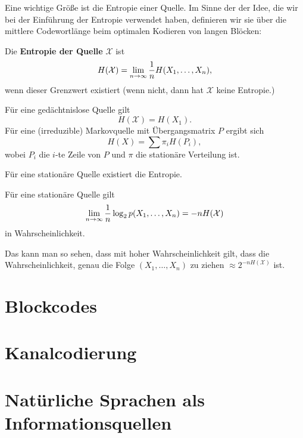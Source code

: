 Eine wichtige Größe ist die Entropie einer Quelle. Im Sinne der 
der Idee, die wir bei der Einführung der Entropie verwendet haben, 
definieren wir sie über die mittlere Codewortlänge beim optimalen
Kodieren von langen Blöcken:

\begin{definition} Die \textbf{Entropie der Quelle} $\mathcal X$ ist 
\[H(\mathcal X)=\lim_{n\to\infty}{1\over n}H(X_1,\dots,X_n),\]
wenn dieser Grenzwert existiert (wenn nicht, dann hat $\mathcal X$
keine Entropie.)
\end{definition}

Für eine gedächtnislose Quelle gilt
\[H(\mathcal X)=H(X_1).\]
Für eine (irreduzible) Markovquelle mit Übergangsmatrix $P$ ergibt sich
\[H(X)=\sum\pi_iH(P_i),\]
wobei $P_i$ die $i$-te Zeile von $P$ und $\pi$ die stationäre Verteilung ist.

Für eine stationäre  Quelle existiert die Entropie.

\begin{satz} Für eine stationäre Quelle gilt
\[\lim_{n\to\infty}{1\over n}\log_2 p(X_1,\dots,X_n)=-nH(\mathcal X)\]
in Wahrscheinlichkeit.
\end{satz}
Das kann man so sehen, dass mit hoher Wahrscheinlichkeit gilt, dass die 
Wahrscheinlichkeit, genau die Folge $(X_1,\dots,X_n)$ zu ziehen
$\approx 2^{-nH(\mathcal X)}$ ist.

\ifdefined\uebsps

\fi
{}
\section{Blockcodes}
\section{Kanalcodierung}
\section{Natürliche Sprachen als Informationsquellen}
